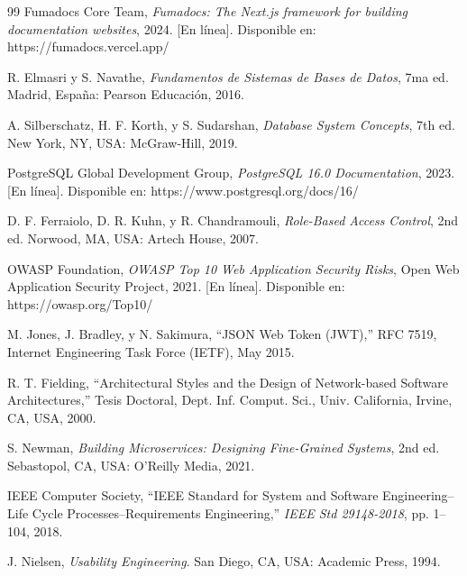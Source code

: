 \begin{thebibliography}{99}
Fumadocs Core Team, \textit{Fumadocs: The Next.js framework for building documentation websites}, 2024. [En línea]. Disponible en: https://fumadocs.vercel.app/

R. Elmasri y S. Navathe, \textit{Fundamentos de Sistemas de Bases de Datos}, 7ma ed. Madrid, España: Pearson Educación, 2016.

A. Silberschatz, H. F. Korth, y S. Sudarshan, \textit{Database System Concepts}, 7th ed. New York, NY, USA: McGraw-Hill, 2019.

PostgreSQL Global Development Group, \textit{PostgreSQL 16.0 Documentation}, 2023. [En línea]. Disponible en: https://www.postgresql.org/docs/16/

D. F. Ferraiolo, D. R. Kuhn, y R. Chandramouli, \textit{Role-Based Access Control}, 2nd ed. Norwood, MA, USA: Artech House, 2007.

OWASP Foundation, \textit{OWASP Top 10 Web Application Security Risks}, Open Web Application Security Project, 2021. [En línea]. Disponible en: https://owasp.org/Top10/

M. Jones, J. Bradley, y N. Sakimura, ``JSON Web Token (JWT),'' RFC 7519, Internet Engineering Task Force (IETF), May 2015.

R. T. Fielding, ``Architectural Styles and the Design of Network-based Software Architectures,'' Tesis Doctoral, Dept. Inf. Comput. Sci., Univ. California, Irvine, CA, USA, 2000.

S. Newman, \textit{Building Microservices: Designing Fine-Grained Systems}, 2nd ed. Sebastopol, CA, USA: O'Reilly Media, 2021.

IEEE Computer Society, ``IEEE Standard for System and Software Engineering--Life Cycle Processes--Requirements Engineering,'' \textit{IEEE Std 29148-2018}, pp. 1--104, 2018.

J. Nielsen, \textit{Usability Engineering}. San Diego, CA, USA: Academic Press, 1994.

\end{thebibliography}
